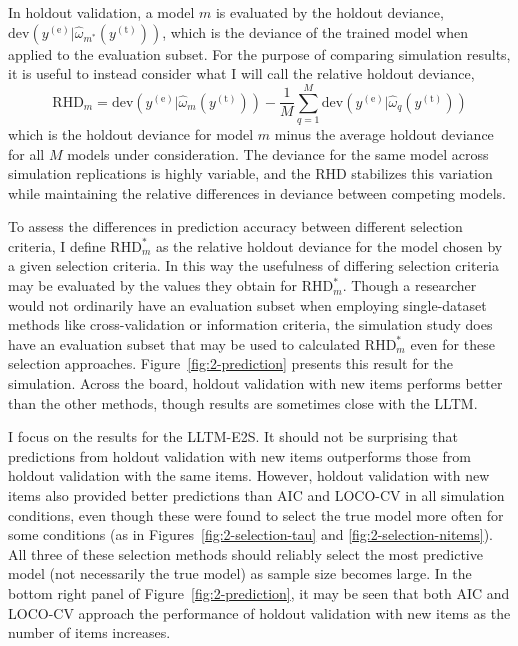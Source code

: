 In holdout validation, a model $m$ is evaluated by the holdout deviance,
$\mathrm{dev}(y^{(\mathrm{e})} | \hat \omega_{m^*}(y^{(\mathrm{t})}))$,
which is the deviance of the trained model when applied to the evaluation subset. For the purpose of comparing simulation results, it is useful to instead consider what I will call the relative holdout deviance,
\begin{equation}
	\mathrm{RHD}_m = \mathrm{dev}(y^{(\mathrm{e})} | \hat \omega_{m}(y^{(\mathrm{t})})) -
	                 \frac{1}{M} \sum_{q=1}^M 
	                   \mathrm{dev}(y^{(\mathrm{e})} | \hat \omega_{q}(y^{(\mathrm{t})}))
\end{equation}
which is the holdout deviance for model $m$ minus the average holdout deviance for all $M$ models under consideration. The deviance for the same model across simulation replications is highly variable, and the RHD stabilizes this variation while maintaining the relative differences in deviance between competing models.

To assess the differences in prediction accuracy between different selection criteria, I define $\mathrm{RHD}_m^*$ as the relative holdout deviance for the model chosen by a given selection criteria. In this way the usefulness of differing selection criteria may be evaluated by the values they obtain for $\mathrm{RHD}_m^*$. Though a researcher would not ordinarily have an evaluation subset when employing single-dataset methods like cross-validation or information criteria, the simulation study does have an evaluation subset that may be used to calculated $\mathrm{RHD}_m^*$ even for these selection approaches. Figure~\ref{fig:2-prediction} presents this result for the simulation. Across the board, holdout validation with new items performs better than the other methods, though results are sometimes close with the LLTM. 

I focus on the results for the LLTM-E2S. It should not be surprising that predictions from holdout validation with new items outperforms those from holdout validation with the same items. However, holdout validation with new items also provided better predictions than AIC and LOCO-CV in all simulation conditions, even though these were found to select the true model more often for some conditions (as in Figures~\ref{fig:2-selection-tau} and \ref{fig:2-selection-nitems}). All three of these selection methods should reliably select the most predictive model (not necessarily the true model) as sample size becomes large. In the bottom right panel of Figure~\ref{fig:2-prediction}, it may be seen that both AIC and LOCO-CV approach the performance of holdout validation with new items as the number of items increases.

